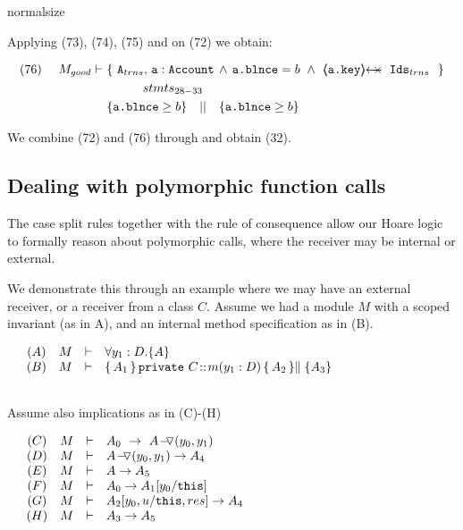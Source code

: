 \begin{proofO}
normalsize

Applying (73), (74), (75) and {} on (72) we obtain:

\small
 \begin{align*}
 \text{(76)}  \ \ \ \ M_{good} \vdash  \ 
		&	\{  \ \Alocalstr, \, \prg{a}:\prg{Account}\, \wedge\,  \prg{a.\balance}=b\ \wedge \ \protectedFrom {\prg{a.key}} {\Idstr}\ \  \} \\
		&  \SPT   stmts_{28-33} \\
		& \{ \prg{a.\balance}\geq b \} \ \ \  || \ \ \  \{ \prg{a.\balance}\geq b \}
\end{align*}
\normalsize

We combine  (72) and (76) through {} and obtain (32).

\end{proofO}

\subsection{Dealing with polymorphic function calls}

The case split rules together with the rule of consequence allow our Hoare logic to formally reason about polymorphic calls, where the receiver may be internal or external.

We demonstrate this through an example where we may have an external receiver, or a receiver from a class $C$. Assume we had a module $M$ with a scoped invariant (as in A), and an internal method specification as in (B). 

$\begin{array}{lclcl}
& (A)& M & \vdash & \TwoStatesN{y_1:D}{A} \\
& (B) & M & \vdash & \mprepostLong {A_1}{ \prg{private}\ C} {m}   {y_1: D} {A_2} { \parallel \{A_3\}}  \\
\\
  \end{array}
$

Assume also implications as in (C)-(H)

$\begin{array}{lclcl}
&  (C) & M & \vdash & A_0 \ \rightarrow \ \PushASLong {(y_0,y_1)}{A}\\
&  (D) & M & \vdash &  \PushASLong {(y_0,y_1)}{A} \rightarrow A_4\\
 & (E) &  M & \vdash & A \rightarrow A_5\\
  & (F) &  M & \vdash & A_0 \rightarrow A_1[y_0/\prg{this}]\\
  & (G) &  M & \vdash & A_2[y_0,u/\prg{this},res] \rightarrow A_4 \\
    & (H) &  M & \vdash & A_3  \rightarrow A_5 
\\
  \end{array}
$

